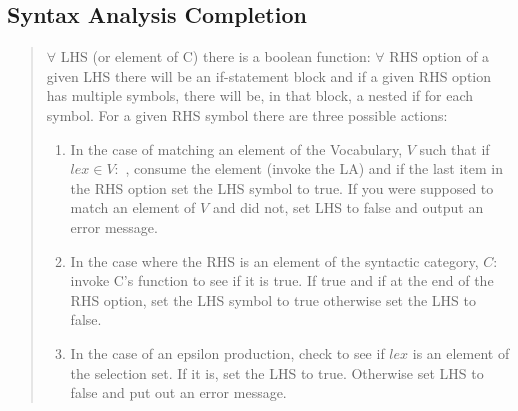 \documentclass[11pt]{article}
\begin{document}
\subsection {Syntax Analysis Completion}
\begin{quote}
$\forall$ LHS (or element of C) there is a boolean function:
$\forall$ RHS option of a given LHS there will be an if-statement block and if a given RHS option has multiple symbols,  there will be, in that block, a nested if for each symbol.  For a given RHS symbol there are three possible actions:
\begin{enumerate}
\item In the case of matching an element of the Vocabulary, $V$ such that  if $lex \in V:$ , consume the element (invoke the LA) and if the last item in the RHS option set the LHS symbol to true.  If you were supposed to match an element of $V$ and did not, set LHS to false and output an error message.  
\item In the case where the RHS is an element of the syntactic category, $C$: invoke C's function to see if it is true.  If true and if at the end of the RHS option, set the LHS symbol to true otherwise set the LHS to false.  
\item In the case of an epsilon production, check to see if $lex$ is an element of the selection set.  If it is, set the LHS to true.  Otherwise set LHS to false and put out an error message.  
\end{enumerate}

\end{quote}



 
\end{document}
